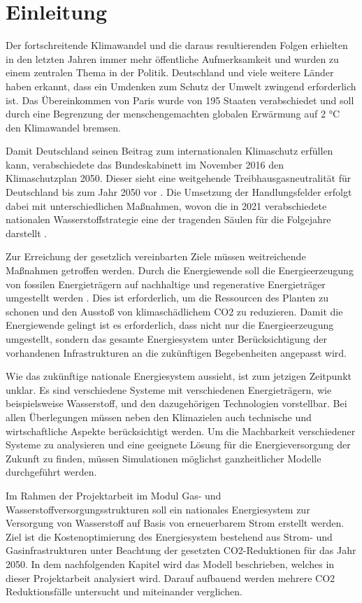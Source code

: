 \section{Einleitung}

Der fortschreitende Klimawandel und die daraus resultierenden Folgen erhielten in den letzten Jahren immer mehr öffentliche Aufmerksamkeit und wurden zu einem zentralen Thema in der Politik. Deutschland und viele weitere Länder haben erkannt, dass ein Umdenken zum Schutz der Umwelt zwingend erforderlich ist. Das Übereinkommen von Paris wurde von 195 Staaten verabschiedet und soll durch eine Begrenzung der menschengemachten globalen Erwärmung auf 2 °C den Klimawandel bremsen. \cite{tietz_2021}

Damit Deutschland seinen Beitrag zum internationalen Klimaschutz erfüllen kann, verabschiedete das Bundeskabinett im November 2016 den Klimaschutzplan 2050. Dieser sieht eine weitgehende Treibhausgasneutralität für Deutschland bis zum Jahr 2050 vor \cite{bmu}.
Die Umsetzung der Handlungsfelder erfolgt dabei mit unterschiedlichen Maßnahmen, wovon die in 2021 verabschiedete nationalen Wasserstoffstrategie eine der tragenden Säulen für die Folgejahre darstellt \cite{bmbfNatH2}.

Zur Erreichung der gesetzlich vereinbarten Ziele müssen weitreichende Maßnahmen getroffen werden.
Durch die Energiewende soll die Energieerzeugung von fossilen Energieträgern auf nachhaltige und regenerative Energieträger umgestellt werden \cite{bund}. Dies ist erforderlich, um die Ressourcen des Planten zu schonen und den Ausstoß von klimaschädlichem CO2 zu reduzieren. Damit die Energiewende gelingt ist es erforderlich, dass nicht nur die Energieerzeugung umgestellt, sondern das gesamte Energiesystem unter Berücksichtigung der vorhandenen Infrastrukturen an die zukünftigen Begebenheiten angepasst wird.

Wie das zukünftige nationale Energiesystem aussieht, ist zum jetzigen Zeitpunkt unklar. Es sind verschiedene Systeme mit verschiedenen Energieträgern, wie beispielsweise Wasserstoff, und den dazugehörigen Technologien vorstellbar. 
Bei allen Überlegungen müssen neben den Klimazielen auch technische und wirtschaftliche Aspekte berücksichtigt werden. 
Um die Machbarkeit verschiedener Systeme zu analysieren und eine geeignete Lösung für die Energieversorgung der Zukunft zu finden, müssen Simulationen möglichst ganzheitlicher Modelle durchgeführt werden.

Im Rahmen der Projektarbeit im Modul Gas- und Wasserstoffversorgungsstrukturen soll ein nationales Energiesystem zur Versorgung von Wasserstoff auf Basis von erneuerbarem Strom erstellt werden. Ziel ist die Kostenoptimierung des Energiesystem bestehend aus Strom- und Gasinfrastrukturen unter Beachtung der gesetzten CO2-Reduktionen für das Jahr 2050. In dem nachfolgenden Kapitel wird das Modell beschrieben, welches in dieser Projektarbeit analysiert wird. Darauf aufbauend werden mehrere CO2 Reduktionsfälle untersucht und miteinander verglichen.